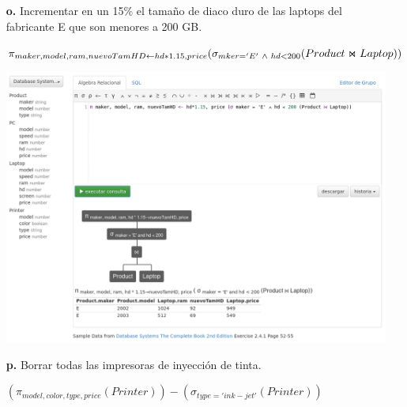 \documentclass[12pt, letterpaper]{article}
\begin{document}
\begin{itemize}
\begin{itemize}
                \item[\textbf{o.}]  Incrementar en un 15\% el tamaño de diaco 
                                    duro de las laptops del fabricante E que 
                                    son menores a 200 GB.

                                    \begin{center}
                                        $\pi_{maker, model, ram, nuevoTamHD \leftarrow hd*1.15, price}(\sigma_{mker='E' \hspace{.1cm} \land \hspace{.1cm} hd < 200}(Product \Join Laptop))$ \vspace{.3cm}

                                        \includegraphics[scale=0.25]{o.png}
                                    \end{center}

                \item[\textbf{p.}]  Borrar todas las impresoras de inyección 
                                    de tinta.

                                    \begin{center}
                                        $(\pi_{model, color, type, price}(Printer))- (\sigma_{type='ink-jet'}(Printer))$ \vspace{.3cm}


\end{center}
\end{itemize}
\end{itemize}
\end{document}
